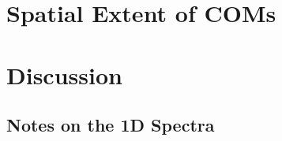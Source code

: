 \documentclass[twocolumn]{aastex62}
\newcommand{\kms}{\mbox{\,km\,s$^{-1}$}}
\newcommand{\mhz}{\mbox{\,MHz}}
\newcommand{\methylformate}{\mbox{CH$_{3}$OCHO}}
\begin{document}

\section{Spatial Extent of COMs}
\section{Discussion}
\subsection{Notes on the 1D Spectra}



\end{document}
